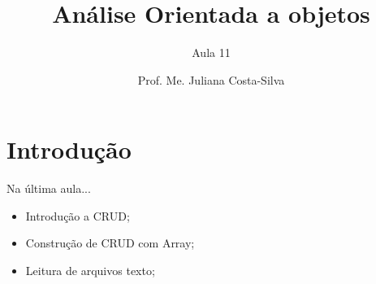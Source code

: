 \documentclass[11pt,aspectratio=43,ignorenonframetext,t]{beamer}
\title{Análise Orientada a objetos}
\subtitle{Aula 11}
\author{Prof. Me. Juliana Costa-Silva}
\begin{document}
\maketitle


\section{Introdução}
\begin{frame}{Na última aula...}
 \begin{itemize}
  \item Introdução a CRUD;
  \item Construção de CRUD com Array;
  \item Leitura de arquivos texto;
 \end{itemize}
\end{frame}
\end{document}

